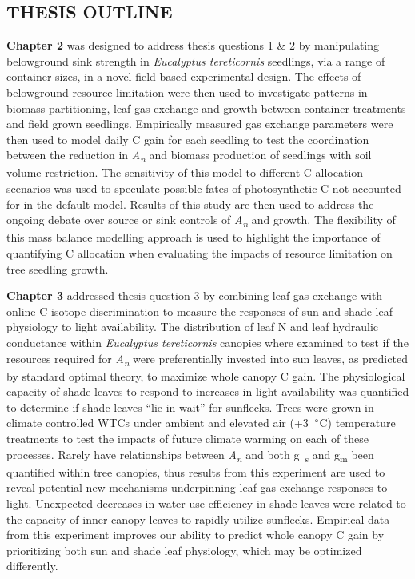 \documentclass[a4paper]{article}
\begin{document}
\subsection*{THESIS OUTLINE}

\textbf{Chapter 2} was designed to address thesis questions 1 \& 2 by manipulating belowground sink strength in \textit{Eucalyptus tereticornis} seedlings, via a range of container sizes, in a novel field-based experimental design. The effects of belowground resource limitation were then used to investigate patterns in biomass partitioning, leaf gas exchange and growth between container treatments and field grown seedlings. Empirically measured gas exchange parameters were then used to model daily C gain for each seedling to test the coordination between the reduction in \textit{A\textsubscript{n}} and biomass production of seedlings with soil volume restriction. The sensitivity of this model to different C allocation scenarios was used to speculate possible fates of photosynthetic C not accounted for in the default model. Results of this study are then used to address the ongoing debate over source or sink controls of \textit{A\textsubscript{n}} and growth. The flexibility of this mass balance modelling approach is used to highlight the importance of quantifying C allocation when evaluating the impacts of resource limitation on tree seedling growth.

\textbf{Chapter 3} addressed thesis question 3 by combining leaf gas exchange with online C isotope discrimination to measure the responses of sun and shade leaf physiology to light availability. The distribution of leaf N and leaf hydraulic conductance within \textit{Eucalyptus tereticornis} canopies where examined to test if the resources required for \textit{A\textsubscript{n}} were preferentially invested into sun leaves, as predicted by standard optimal theory, to maximize whole canopy C gain. The physiological capacity of shade leaves to respond to increases in light availability was quantified to determine if shade leaves “lie in wait” for sunflecks. Trees were grown in climate controlled WTCs under ambient and elevated air (+3~$\degree$C) temperature treatments to test the impacts of future climate warming on each of these processes. Rarely have relationships between \textit{A\textsubscript{n}} and both g~\textsubscript{s} and g\textsubscript{m} been quantified within tree canopies, thus results from this experiment are used to reveal potential new mechanisms underpinning leaf gas exchange responses to light. Unexpected decreases in water-use efficiency in shade leaves were related to the capacity of inner canopy leaves to rapidly utilize sunflecks. Empirical data from this experiment improves our ability to predict whole canopy C gain by prioritizing both sun and shade leaf physiology, which may be optimized differently.
\end{document}
